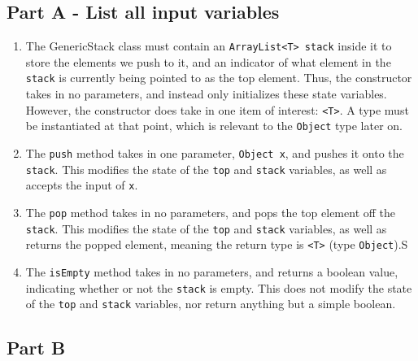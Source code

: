 \documentclass{article}
\newcommand{\Stack}{\texttt{ArrayList<T> stack} }
\begin{document}
\subsection*{Part A - List all input variables}

\begin{enumerate}
    \item The GenericStack class must contain an \Stack inside it to store the elements we push to it, and an indicator of what element in the \texttt{stack} is currently being pointed to as the top element. Thus, the constructor takes in no parameters, and instead only initializes these state variables. However, the constructor does take in one item of interest: \texttt{<T>}. A type must be instantiated at that point, which is relevant to the \texttt{Object} type later on.
    \item The \texttt{push} method takes in one parameter, \texttt{Object x}, and pushes it onto the \texttt{stack}. This modifies the state of the \texttt{top} and \texttt{stack} variables, as well as accepts the input of \texttt{x}.
    \item The \texttt{pop} method takes in no parameters, and pops the top element off the \texttt{stack}. This modifies the state of the \texttt{top} and \texttt{stack} variables, as well as returns the popped element, meaning the return type is \texttt{<T>} (type \texttt{Object}).S
    \item The \texttt{isEmpty} method takes in no parameters, and returns a boolean value, indicating whether or not the \texttt{stack} is empty. This does not modify the state of the \texttt{top} and \texttt{stack} variables, nor return anything but a simple boolean.
\end{enumerate}

\subsection*{Part B}
\end{document}
